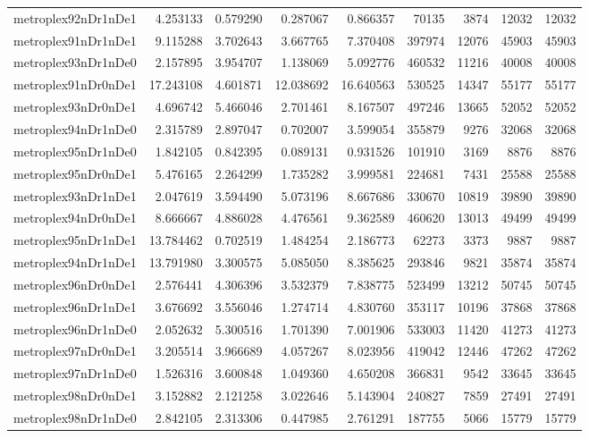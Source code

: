\begin{longtable}{|l|r|r|r|r|r|r|r|r|}
metroplex92nDr1nDe1 & 4.253133 & 0.579290 & 0.287067 & 0.866357 & 70135 & 3874 & 12032 & 12032 \\
metroplex91nDr1nDe1 & 9.115288 & 3.702643 & 3.667765 & 7.370408 & 397974 & 12076 & 45903 & 45903 \\
metroplex93nDr1nDe0 & 2.157895 & 3.954707 & 1.138069 & 5.092776 & 460532 & 11216 & 40008 & 40008 \\
metroplex91nDr0nDe1 & 17.243108 & 4.601871 & 12.038692 & 16.640563 & 530525 & 14347 & 55177 & 55177 \\
metroplex93nDr0nDe1 & 4.696742 & 5.466046 & 2.701461 & 8.167507 & 497246 & 13665 & 52052 & 52052 \\
metroplex94nDr1nDe0 & 2.315789 & 2.897047 & 0.702007 & 3.599054 & 355879 & 9276 & 32068 & 32068 \\
metroplex95nDr1nDe0 & 1.842105 & 0.842395 & 0.089131 & 0.931526 & 101910 & 3169 & 8876 & 8876 \\
metroplex95nDr0nDe1 & 5.476165 & 2.264299 & 1.735282 & 3.999581 & 224681 & 7431 & 25588 & 25588 \\
metroplex93nDr1nDe1 & 2.047619 & 3.594490 & 5.073196 & 8.667686 & 330670 & 10819 & 39890 & 39890 \\
metroplex94nDr0nDe1 & 8.666667 & 4.886028 & 4.476561 & 9.362589 & 460620 & 13013 & 49499 & 49499 \\
metroplex95nDr1nDe1 & 13.784462 & 0.702519 & 1.484254 & 2.186773 & 62273 & 3373 & 9887 & 9887 \\
metroplex94nDr1nDe1 & 13.791980 & 3.300575 & 5.085050 & 8.385625 & 293846 & 9821 & 35874 & 35874 \\
metroplex96nDr0nDe1 & 2.576441 & 4.306396 & 3.532379 & 7.838775 & 523499 & 13212 & 50745 & 50745 \\
metroplex96nDr1nDe1 & 3.676692 & 3.556046 & 1.274714 & 4.830760 & 353117 & 10196 & 37868 & 37868 \\
metroplex96nDr1nDe0 & 2.052632 & 5.300516 & 1.701390 & 7.001906 & 533003 & 11420 & 41273 & 41273 \\
metroplex97nDr0nDe1 & 3.205514 & 3.966689 & 4.057267 & 8.023956 & 419042 & 12446 & 47262 & 47262 \\
metroplex97nDr1nDe0 & 1.526316 & 3.600848 & 1.049360 & 4.650208 & 366831 & 9542 & 33645 & 33645 \\
metroplex98nDr0nDe1 & 3.152882 & 2.121258 & 3.022646 & 5.143904 & 240827 & 7859 & 27491 & 27491 \\
metroplex98nDr1nDe0 & 2.842105 & 2.313306 & 0.447985 & 2.761291 & 187755 & 5066 & 15779 & 15779 \\

\end{longtable}
